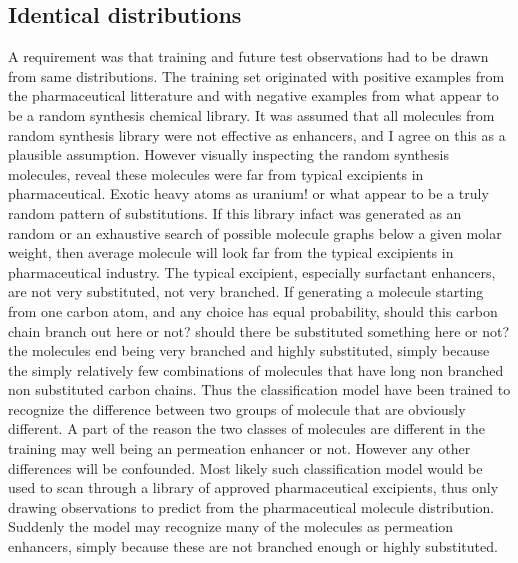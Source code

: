 \subsection{Identical distributions}
A requirement was that training and future test observations had to be drawn from same distributions. The training set originated with positive examples from the pharmaceutical litterature and with negative examples from what appear to be a random synthesis chemical library. It was assumed that all molecules from random synthesis library were not effective as enhancers, and I agree on this as a plausible assumption. However visually inspecting the random synthesis molecules, reveal these molecules were far from typical excipients in pharmaceutical. Exotic heavy atoms as uranium! or what appear to be a truly random pattern of substitutions. If this library infact was generated as an random or an exhaustive search of possible molecule graphs below a given molar weight, then average molecule will look far from the typical excipients in pharmaceutical industry. The typical excipient, especially surfactant enhancers, are not very substituted, not very branched. If generating a molecule starting from one carbon atom, and any choice has equal probability, should this carbon chain branch out here or not? should there be substituted something here or not? the molecules end being very branched and highly substituted, simply because the simply relatively few combinations of molecules that have long non branched non substituted carbon chains. Thus the classification model have been trained to recognize the difference between two groups of molecule that are obviously different. A part of the reason the two classes of molecules are different in the training may well being an permeation enhancer or not. However any other differences will be confounded. Most likely such classification model would be used to scan through a library of approved pharmaceutical excipients, thus only drawing observations to predict from the pharmaceutical molecule distribution. Suddenly the model may recognize many of the molecules as permeation enhancers, simply because these are not branched enough or highly substituted.

